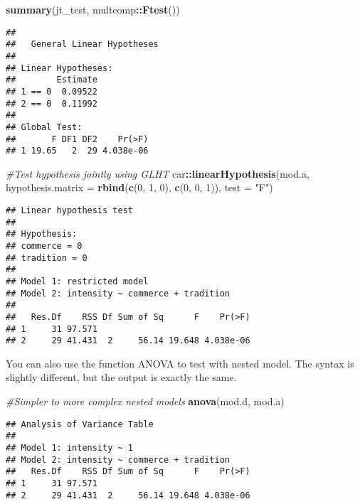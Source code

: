 \documentclass[]{book}
\newenvironment{Shaded}{\begin{snugshade}}{\end{snugshade}}
\newcommand{\CommentTok}[1]{\textcolor[rgb]{0.56,0.35,0.01}{\textit{#1}}}
\newcommand{\DataTypeTok}[1]{\textcolor[rgb]{0.13,0.29,0.53}{#1}}
\newcommand{\DecValTok}[1]{\textcolor[rgb]{0.00,0.00,0.81}{#1}}
\newcommand{\KeywordTok}[1]{\textcolor[rgb]{0.13,0.29,0.53}{\textbf{#1}}}
\newcommand{\NormalTok}[1]{#1}
\newcommand{\OperatorTok}[1]{\textcolor[rgb]{0.81,0.36,0.00}{\textbf{#1}}}
\newcommand{\StringTok}[1]{\textcolor[rgb]{0.31,0.60,0.02}{#1}}
\theoremstyle{definition}
\theoremstyle{definition}
\theoremstyle{definition}
\theoremstyle{remark}
\begin{document}
\begin{Shaded}
\begin{Highlighting}[]
\KeywordTok{summary}\NormalTok{(jt_test, multcomp}\OperatorTok{::}\KeywordTok{Ftest}\NormalTok{())}
\end{Highlighting}
\end{Shaded}

\begin{verbatim}
## 
##   General Linear Hypotheses
## 
## Linear Hypotheses:
##        Estimate
## 1 == 0  0.09522
## 2 == 0  0.11992
## 
## Global Test:
##       F DF1 DF2    Pr(>F)
## 1 19.65   2  29 4.038e-06
\end{verbatim}

\begin{Shaded}
\begin{Highlighting}[]
\CommentTok{#Test hypothesis jointly using GLHT}
\NormalTok{car}\OperatorTok{::}\KeywordTok{linearHypothesis}\NormalTok{(mod.a, }\DataTypeTok{hypothesis.matrix =} \KeywordTok{rbind}\NormalTok{(}\KeywordTok{c}\NormalTok{(}\DecValTok{0}\NormalTok{, }\DecValTok{1}\NormalTok{, }\DecValTok{0}\NormalTok{), }\KeywordTok{c}\NormalTok{(}\DecValTok{0}\NormalTok{, }\DecValTok{0}\NormalTok{, }\DecValTok{1}\NormalTok{)), }\DataTypeTok{test =} \StringTok{"F"}\NormalTok{)}
\end{Highlighting}
\end{Shaded}

\begin{verbatim}
## Linear hypothesis test
## 
## Hypothesis:
## commerce = 0
## tradition = 0
## 
## Model 1: restricted model
## Model 2: intensity ~ commerce + tradition
## 
##   Res.Df    RSS Df Sum of Sq      F    Pr(>F)
## 1     31 97.571                              
## 2     29 41.431  2     56.14 19.648 4.038e-06
\end{verbatim}

You can also use the function ANOVA to test with nested model. The
syntax is slightly different, but the output is exactly the same.

\begin{Shaded}
\begin{Highlighting}[]
\CommentTok{#Simpler to more complex nested models}
\KeywordTok{anova}\NormalTok{(mod.d, mod.a)}
\end{Highlighting}
\end{Shaded}

\begin{verbatim}
## Analysis of Variance Table
## 
## Model 1: intensity ~ 1
## Model 2: intensity ~ commerce + tradition
##   Res.Df    RSS Df Sum of Sq      F    Pr(>F)
## 1     31 97.571                              
## 2     29 41.431  2     56.14 19.648 4.038e-06
\end{verbatim}
\end{document}
